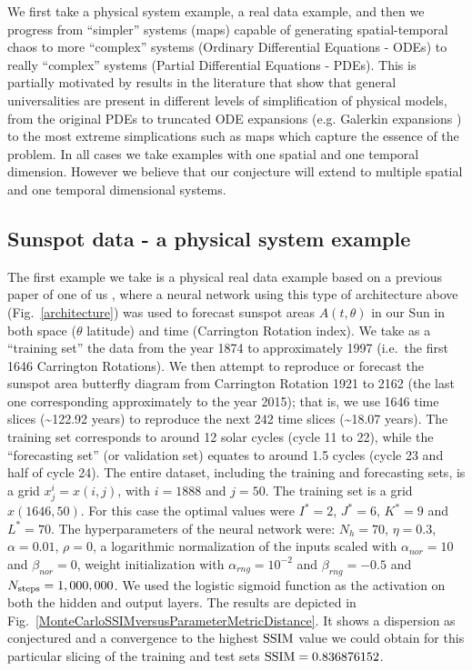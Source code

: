\documentclass[journal]{IEEEtran}
\begin{document}
We first take a physical system example, a real data example, and then we progress from ``simpler'' systems (maps)
capable of generating spatial-temporal chaos
to more ``complex'' systems (Ordinary Differential Equations - ODEs) to really ``complex'' systems (Partial
Differential Equations - PDEs). This is partially motivated by results in the literature that show
that general universalities are present in different levels of simplification of physical models, from the original PDEs
to truncated ODE expansions (e.g. Galerkin expansions \cite{2001Chaos..11..404C}) to the most extreme simplications such
as maps which capture the essence of the problem. In all cases we take examples with one spatial and one temporal dimension. However we believe
that our conjecture will extend to multiple spatial and one temporal dimensional systems.

\subsection{Sunspot data - a physical system example}


The first example we take is a physical real data example based on a previous paper of one of us \cite{covaspeixinhojoao}, where a 
neural network using this type of architecture above (Fig.\ \ref{architecture}) was used to forecast sunspot areas $A(t,\theta)$ in our 
Sun in both space ($\theta$ latitude) and time (Carrington Rotation index). We take as a ``training set'' the data from the year 1874 to 
approximately 1997 (i.e.\ the first 1646 Carrington Rotations). We then attempt to reproduce or forecast the sunspot area butterfly 
diagram from Carrington Rotation 1921 to 2162 (the last one corresponding approximately to the year 2015); that is, we use 1646 time 
slices (\textasciitilde  122.92 years) to reproduce the next 242 time slices (\textasciitilde  18.07 years). The training set 
corresponds to around 12 solar cycles (cycle 11 to 22), while the ``forecasting set'' (or validation set) equates to around 1.5 cycles 
(cycle 23 and half of cycle 24). The entire dataset, including the training and forecasting sets, is a grid $x^i_j=x(i,j)$, with 
$i=1888$ and $j=50$. The training set is a grid $x(1646,50)$. For this case the optimal values were $I^*=2$, $J^*=6$, $K^*=9$ and 
$L^*=70$. 
The hyperparameters of the neural network were:
$N_h=70$, $\eta=0.3$, $\alpha=0.01$, $\rho=0$, a logarithmic normalization of the inputs scaled
 with $\alpha_{nor} = 10$ and $\beta_{nor} = 0$, weight initialization with $\alpha_{rng} = 10^{-2}$ and $\beta_{rng} = -0.5$ 
 and $N_{\textnormal{steps}}=1,000,000$. We used the logistic sigmoid function as the activation on both the hidden and output layers.
The results are depicted in Fig.\ \ref{MonteCarloSSIMversusParameterMetricDistance}.  It shows a dispersion as conjectured and 
a convergence to the highest $\textnormal{SSIM}$ value we could obtain for this particular slicing of the training and test sets 
$\textnormal{SSIM}= 0.836876152$.
\end{document}
